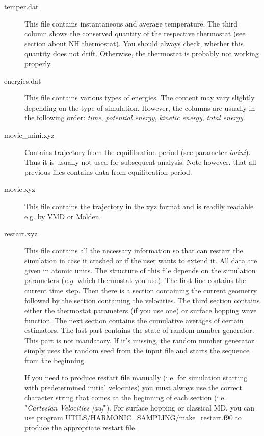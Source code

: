 \documentclass[12pt,a4paper]{article}
\begin{document}
\begin{description}
\item[temper.dat] This file contains instantaneous and average temperature. The third column shows the conserved quantity of the respective thermostat (see section about NH thermostat). You should always check, whether this quantity does not drift. Otherwise, the thermostat
is probably not working properly.

\item[energies.dat] This file contains various types of energies. The content may vary slightly depending on the type of simulation. However, the columns are usually in the following order: \textit{time}, \textit{potential energy}, \textit{kinetic energy}, \textit{total energy}.

\item[movie\_mini.xyz]  Contains trajectory from the equilibration period (see parameter \textit{imini}). Thus it is usually not used for subsequent analysis. Note however, that all previous files contains data from equilibration period.

\item[movie.xyz] This file contains the trajectory in the xyz format and is readily readable e.g. by VMD or Molden.

\item[restart.xyz] This file contains all the necessary information so that \abin can restart the simulation in case it crashed or if the user wants to extend it. All data are given in atomic units. The structure of this file depends on the simulation parameters (\textit{e.g.} which thermostat you use). The first line contains the current time step. Then there is a section containing the current geometry followed by the section containing the velocities. The third section contains either the thermostat parameters (if you use one) or surface hopping wave function. The next section contains the cumulative averages of certain estimators. The last part contains the state of random number generator. This part is not mandatory. If it's missing, the random number generator simply uses the random seed from the input file and starts the sequence from the beginning.

If you need to produce restart file manually (i.e. for simulation starting with predetermined initial velocities) you must always use the correct character string that comes at the beginning of each section (i.e. "\textit{Cartesian Velocities [au]}").
For surface hopping or classical MD, you can use program UTILS/HARMONIC\_SAMPLING/make\_restart.f90 to produce the appropriate restart file.

\end{description}
\end{document}

